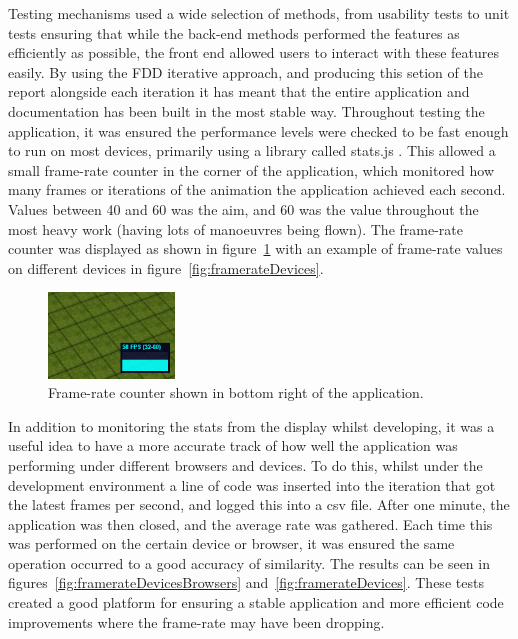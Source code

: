 Testing mechanisms used a wide selection of methods, from usability tests to unit tests ensuring that while the back-end methods performed the features as efficiently as possible, the front end allowed users to interact with these features easily. By using the FDD iterative approach, and producing this setion of the report alongside each iteration it has meant that the entire application and documentation has been built in the most stable way. Throughout testing the application, it was ensured the performance levels were checked to be fast enough to run on most devices, primarily using a library called stats.js \cite{stats}. This allowed a small frame-rate counter in the corner of the application, which monitored how many frames or iterations of the animation the application achieved each second. Values between 40 and 60 was the aim, and 60 was the value throughout the most heavy work (having lots of manoeuvres being flown). The frame-rate counter was displayed as shown in figure~\ref{fig:framerate} with an example of frame-rate values on different devices in figure~\ref{fig:framerateDevices}.

\begin{figure}[h]
  \centering
      \includegraphics[width=0.3\textwidth]{images/framerate.png}
  \caption{Frame-rate counter shown in bottom right of the application.}
  \label{fig:framerate}
\end{figure}

In addition to monitoring the stats from the display whilst developing, it was a useful idea to have a more accurate track of how well the application was performing under different browsers and devices. To do this, whilst under the development environment a line of code was inserted into the iteration that got the latest frames per second, and logged this into a csv file. After one minute, the application was then closed, and the average rate was gathered. Each time this was performed on the certain device or browser, it was ensured the same operation occurred to a good accuracy of similarity. The results can be seen in figures~\ref{fig:framerateDevicesBrowsers} and~\ref{fig:framerateDevices}. These tests created a good platform for ensuring a stable application and more efficient code improvements where the frame-rate may have been dropping.

